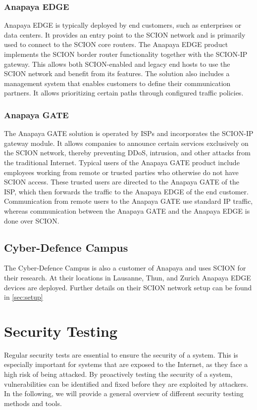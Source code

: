 \subsubsection{Anapaya EDGE}
Anapaya EDGE is typically deployed by end customers, such as enterprises or data centers.
It provides an entry point to the SCION network and is primarily used to connect to the SCION core routers.
The Anapaya EDGE product implements the SCION border router functionality together with the SCION-IP gateway.
This allows both SCION-enabled and legacy end hosts to use the SCION network and benefit from its features.
The solution also includes a management system that enables customers to define their communication partners.
It allows prioritizing certain paths through configured traffic policies.

\subsubsection{Anapaya GATE}
The Anapaya GATE solution is operated by ISPs and incorporates the SCION-IP gateway module.
It allows companies to announce certain services exclusively on the SCION network, thereby preventing DDoS, intrusion, and other attacks from the traditional Internet.
Typical users of the Anapaya GATE product include employees working from remote or trusted parties who otherwise do not have SCION access.
These trusted users are directed to the Anapaya GATE of the ISP, which then forwards the traffic to the Anapaya EDGE of the end customer.
Communication from remote users to the Anapaya GATE use standard IP traffic, whereas communication between the Anapaya GATE and the Anapaya EDGE is done over SCION.

\subsection{Cyber-Defence Campus}
The Cyber-Defence Campus is also a customer of Anapaya and uses SCION for their research.
At their locations in Lausanne, Thun, and Zurich Anapaya EDGE devices are deployed.
Further details on their SCION network setup can be found in \cref{sec:setup}



\section{Security Testing}
\label{sec:security_testing}
Regular security tests are essential to ensure the security of a system.
This is especially important for systems that are exposed to the Internet, as they face a high risk of being attacked.
By proactively testing the security of a system, vulnerabilities can be identified and fixed before they are exploited by attackers.
In the following, we will provide a general overview of different security testing methods and tools.

